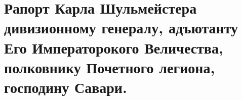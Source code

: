 \documentclass[
  oneside,
  12pt,
  titlepage]{book}
\begin{document}
\hypertarget{ux440ux430ux43fux43eux440ux442-ux43aux430ux440ux43bux430-ux448ux443ux43bux44cux43cux435ux439ux441ux442ux435ux440ux430-ux434ux438ux432ux438ux437ux438ux43eux43dux43dux43eux43cux443-ux433ux435ux43dux435ux440ux430ux43bux443-ux430ux434ux44aux44eux442ux430ux43dux442ux443-ux435ux433ux43e-ux438ux43cux43fux435ux440ux430ux442ux43eux440ux43eux43aux43eux433ux43e-ux432ux435ux43bux438ux447ux435ux441ux442ux432ux430-ux43fux43eux43bux43aux43eux432ux43dux438ux43aux443-ux43fux43eux447ux435ux442ux43dux43eux433ux43e-ux43bux435ux433ux438ux43eux43dux430-ux433ux43eux441ux43fux43eux434ux438ux43dux443-ux441ux430ux432ux430ux440ux438.}{%
\section{Рапорт Карла Шульмейстера дивизионному генералу, адъютанту Его Императорокого Величества, полковнику Почетного легиона, господину Савари.}\label{ux440ux430ux43fux43eux440ux442-ux43aux430ux440ux43bux430-ux448ux443ux43bux44cux43cux435ux439ux441ux442ux435ux440ux430-ux434ux438ux432ux438ux437ux438ux43eux43dux43dux43eux43cux443-ux433ux435ux43dux435ux440ux430ux43bux443-ux430ux434ux44aux44eux442ux430ux43dux442ux443-ux435ux433ux43e-ux438ux43cux43fux435ux440ux430ux442ux43eux440ux43eux43aux43eux433ux43e-ux432ux435ux43bux438ux447ux435ux441ux442ux432ux430-ux43fux43eux43bux43aux43eux432ux43dux438ux43aux443-ux43fux43eux447ux435ux442ux43dux43eux433ux43e-ux43bux435ux433ux438ux43eux43dux430-ux433ux43eux441ux43fux43eux434ux438ux43dux443-ux441ux430ux432ux430ux440ux438.}}
\end{document}
